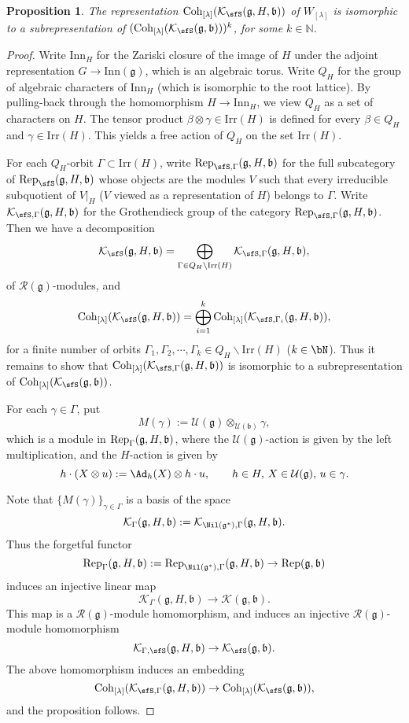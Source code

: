 \documentclass[12pt,a4paper]{amsart}
\newcommand{\BN}{{\mathbb {N}}}
\newcommand{\CK}{{\mathcal {K}}}
\newcommand{\CU}{{\mathcal {U}}}
\newcommand{\g}{\mathfrak g}
\renewcommand{\b}{\mathfrak b}
\numberwithin{equation}{section}
\newtheorem{prop}[thm]{Proposition}
\theoremstyle{remark}
\def\Irr{\mathrm{Irr}}
\def\Coh{\mathrm{Coh}}
\def\Inn{\mathrm{Inn}}
\newcommand{\Lam}{{[\lambda]}}
\begin{document}
 \begin{prop}\label{lem0022}
The representation $\Coh_{\Lam}(\CK_\sfS(\g,H, \b))$ of $W_{[\lambda]}$ is isomorphic to a subrepresentation of $(\Coh_{\Lam}(\CK_\sfS(\g, \b)))^k$, for some $k\in \BN$.
     \end{prop}
\begin{proof}


Write $\Inn_H$ for the Zariski closure of the image of $H$ under  the adjoint representation $G\rightarrow \Inn(\g)$, which is an algebraic torus. Write $Q_H$ for the group of algebraic characters of $\Inn_H$ (which is isomorphic to  the root lattice). By pulling-back through the homomorphism $H\rightarrow \Inn_H$, we view $Q_H$ as a set of characters on $H$.
The tensor product $\beta\otimes \gamma\in \Irr(H)$ is defined for every $\beta\in Q_H$ and $\gamma\in \Irr(H)$. This yields a free action of $Q_H$ on the set $\Irr(H)$.

For each $Q_H$-orbit $\Gamma\subset \Irr(H)$, write $\Rep_{\sfS,\Gamma}(\g,H,\b)$ for the full subcategory of $\Rep_\sfS(\g,H,\b)$ whose objects are  the modules $V$ such that every irreducible subquotient of $V|_H$ ($V$ viewed as a representation of $H$) belongs to $\Gamma$. Write $\CK_{\sfS,\Gamma}(\g,H,\b)$ for the  Grothendieck group of the category $\Rep_{\sfS,\Gamma}(\g,H,\b)$.
Then  we have a decomposition
\[
\CK_\sfS(\g,H,\b)=\bigoplus_{\Gamma\in Q_H\backslash \Irr(H)} \CK_{\sfS,\Gamma}(\g,H,\b),
\]
of $\mathcal R(\g)$-modules, and
\[
\Coh_{\Lam}(\CK_\sfS(\g,H, \b))=\bigoplus_{i=1}^k  \Coh_{\Lam}(\CK_{ \sfS,\Gamma_i}(\g,H,\b)),
\]
for a finite number of orbits $\Gamma_1, \Gamma_2, \cdots, \Gamma_k\in Q_H\backslash \Irr(H)$ ($k\in \bN$). Thus it remains to show that $ \Coh_{\Lam}(\CK_{ \sfS,\Gamma}(\g,H,\b))$ is isomorphic to a subrepresentation of  $\Coh_{\Lam}(\CK_\sfS(\g, \b))$.



For each $\gamma\in \Gamma$, put
\[
  M(\gamma):=\CU(\g)\otimes_{\CU(\b)} \gamma,
\]
which is a module in $\Rep_\Gamma(\g,H,\b)$, where the $\CU(\g)$-action is given by the left multiplication, and the $H$-action is given by
\[
 h\cdot (X\otimes u):=\Ad_h(X)\otimes h \cdot u, \qquad h\in H, \, X\in \CU(\g),\, u\in \gamma.
\]

Note that $\{ M(\gamma)\}_{\gamma\in \Gamma}$ is a basis of the space %
\[
\CK_{\Gamma}(\g,H,\b):=\CK_{\Nil(\g^*),\Gamma}(\g,H,\b).
\]
Thus the forgetful functor
\[
   \Rep_{\Gamma}(\g,H,\b):=\Rep_{\Nil(\g^*),\Gamma}(\g,H,\b)\rightarrow  \Rep(\g,\b)
\]
induces an injective linear map
\[
    \CK_{\Gamma}(\g,H,\b)\rightarrow  \CK(\g,\b).
\]
This map is a $\mathcal R(\g)$-module homomorphism, and induces an injective
$\mathcal R(\g)$-module homomorphism
\[
    \CK_{\Gamma,\sfS}(\g,H,\b)\rightarrow  \CK_\sfS(\g,\b).
\]
The above homomorphism induces an embedding
\[
    \Coh_{\Lam}(\CK_{ \sfS,\Gamma}(\g,H,\b))\rightarrow  \Coh_{\Lam}(\CK_\sfS(\g,\b)),
\]
and the proposition follows.
\end{proof}
\end{document}
